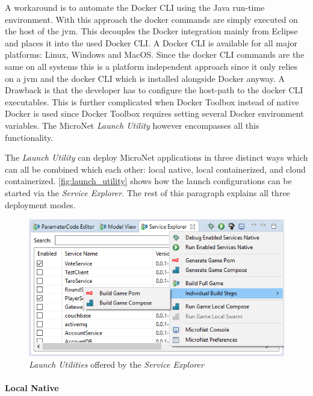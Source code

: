 A workaround is to automate the Docker CLI using the Java run-time environment.
With this approach the docker commands are simply executed on the host of the
\gls{jvm}. This decouples the Docker integration mainly from Eclipse and places
it into the used Docker CLI. A Docker CLI is available for all major platforms:
Linux, Windows and MacOS. Since the docker CLI commands are the same on all
systems this is a platform independent approach since it only relies on a
\gls{jvm} and the docker CLI which is installed alongside Docker anyway. A
Drawback is that the developer has to configure the host-path to the docker CLI
executables. This is further complicated when Docker Toolbox instead of native
Docker is used since Docker Toolbox requires setting several Docker environment
variables. The MicroNet \textit{Launch Utility} however encompasses all this
functionality.

The \textit{Launch Utility} can deploy MicroNet applications in three distinct ways which
can all be combined which each other: local native, local containerized, and
cloud containerized. \autoref{fig:launch_utility} shows how the launch
configurations can be started via the \textit{Service Explorer}. The rest of this
paragraph explains all three deployment modes.

\begin{figure}
	\centering
	\includegraphics[width=14cm]{images/tools/LaunchUtility}
	\caption{\textit{Launch Utilities} offered by the \textit{Service Explorer}}
	\label{fig:launch_utility}
\end{figure}

\paragraph{Local Native}

